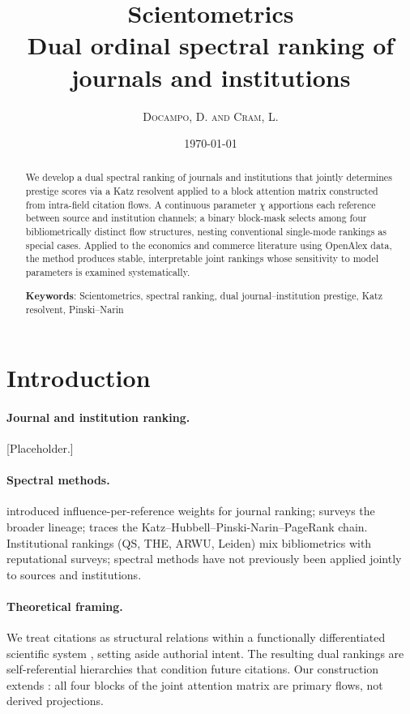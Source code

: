 \documentclass[10pt]{article}
\title{\vspace{-2cm} \flushleft \normalsize Scientometrics\\[1cm]
\large\bfseries\centering Dual ordinal spectral ranking of journals and institutions}
\date{\today}
\author{\textsc{Docampo, D. and Cram, L.}}
\begin{document}
\maketitle

\begin{abstract}
We develop a dual spectral ranking of journals and institutions that
jointly determines prestige scores via a Katz resolvent applied to a
block attention matrix constructed from intra-field citation flows.
A continuous parameter $\chi$ apportions each reference between source
and institution channels; a binary block-mask selects among four
bibliometrically distinct flow structures, nesting conventional
single-mode rankings as special cases.
Applied to the economics and commerce literature using OpenAlex data,
the method produces stable, interpretable joint rankings whose
sensitivity to model parameters is examined systematically.

\medskip\noindent
\textbf{Keywords}: Scientometrics, spectral ranking, dual
journal--institution prestige, Katz resolvent, Pinski--Narin
\end{abstract}

\section{Introduction}

\paragraph{Journal and institution ranking.}
[Placeholder.]

\paragraph{Spectral methods.}
\citet{pinskiNarin1976} introduced influence-per-reference weights for
journal ranking; \citet{vignaSpectralRanking2016} surveys the broader
lineage; \citet{franceschetPagerank2010} traces the
Katz--Hubbell--Pinski-Narin--PageRank chain.
Institutional rankings (QS, THE, ARWU, Leiden) mix bibliometrics with
reputational surveys; spectral methods have not previously been applied
jointly to sources and institutions.

\paragraph{Theoretical framing.}
We treat citations as structural relations within a functionally
differentiated scientific system \citep{woutersThesisCitationCulture1999},
setting aside authorial intent.
The resulting dual rankings are self-referential hierarchies that
condition future citations.
Our construction extends \citet{breigerDualityPersonsGroups1974a}:
all four blocks of the joint attention matrix are primary flows, not
derived projections.
\end{document}
